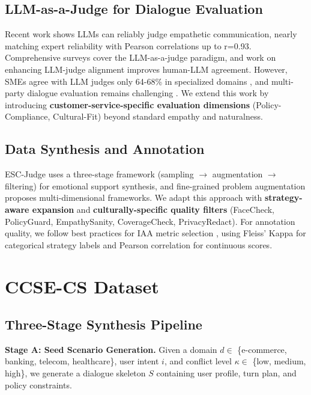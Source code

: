 \documentclass[11pt]{article}
\begin{document}
\subsection{LLM-as-a-Judge for Dialogue Evaluation}

Recent work shows LLMs can reliably judge empathetic communication, nearly matching expert reliability \cite{nature_llm_empathy_2025} with Pearson correlations up to r=0.93. Comprehensive surveys \cite{llm_judge_survey_2025} cover the LLM-as-a-judge paradigm, and work on enhancing LLM-judge alignment \cite{neurips_llm_judge_2025} improves human-LLM agreement. However, SMEs agree with LLM judges only 64-68\% in specialized domains \cite{llm_judge_limitations_2025}, and multi-party dialogue evaluation remains challenging \cite{llm_juide_multiparty_2025}. We extend this work by introducing \textbf{customer-service-specific evaluation dimensions} (Policy-Compliance, Cultural-Fit) beyond standard empathy and naturalness.

\subsection{Data Synthesis and Annotation}

ESC-Judge \cite{ESC_Judge_2025} uses a three-stage framework (sampling $\to$ augmentation $\to$ filtering) for emotional support synthesis, and fine-grained problem augmentation \cite{problem_augmentation_2025} proposes multi-dimensional frameworks. We adapt this approach with \textbf{strategy-aware expansion} and \textbf{culturally-specific quality filters} (FaceCheck, PolicyGuard, EmpathySanity, CoverageCheck, PrivacyRedact). For annotation quality, we follow best practices for IAA metric selection \cite{IAA_metric_selection_2024, IAA_glitters_2022, IAA_complex_tasks_2022, context_agreement_2024}, using Fleiss' Kappa for categorical strategy labels and Pearson correlation for continuous scores.

\section{CCSE-CS Dataset}

\subsection{Three-Stage Synthesis Pipeline}

\textbf{Stage A: Seed Scenario Generation.} Given a domain $d \in$ \{e-commerce, banking, telecom, healthcare\}, user intent $i$, and conflict level $\kappa \in$ \{low, medium, high\}, we generate a dialogue skeleton $S$ containing user profile, turn plan, and policy constraints.
\end{document}
